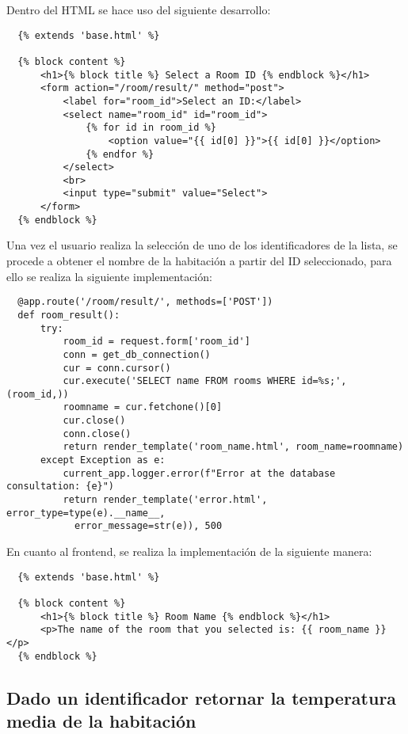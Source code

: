 \documentclass[11pt]{report}
\begin{document}
Dentro del HTML se hace uso del siguiente desarrollo:

\begin{verbatim}
  {% extends 'base.html' %}

  {% block content %}
      <h1>{% block title %} Select a Room ID {% endblock %}</h1>
      <form action="/room/result/" method="post">
          <label for="room_id">Select an ID:</label>
          <select name="room_id" id="room_id">
              {% for id in room_id %}
                  <option value="{{ id[0] }}">{{ id[0] }}</option>
              {% endfor %}
          </select>
          <br>
          <input type="submit" value="Select">
      </form>
  {% endblock %}
\end{verbatim}

Una vez el usuario realiza la selección de uno de los identificadores de la lista, se procede a obtener el nombre de la habitación a partir del ID seleccionado, para ello se realiza la siguiente implementación:

\begin{verbatim}
  @app.route('/room/result/', methods=['POST'])
  def room_result():
      try:
          room_id = request.form['room_id']
          conn = get_db_connection()
          cur = conn.cursor()
          cur.execute('SELECT name FROM rooms WHERE id=%s;', (room_id,))
          roomname = cur.fetchone()[0]
          cur.close()
          conn.close()
          return render_template('room_name.html', room_name=roomname)
      except Exception as e:
          current_app.logger.error(f"Error at the database consultation: {e}")
          return render_template('error.html', error_type=type(e).__name__, 
            error_message=str(e)), 500
\end{verbatim}

En cuanto al frontend, se realiza la implementación de la siguiente manera:

\begin{verbatim}
  {% extends 'base.html' %}

  {% block content %}
      <h1>{% block title %} Room Name {% endblock %}</h1>
      <p>The name of the room that you selected is: {{ room_name }}</p>
  {% endblock %}
\end{verbatim}

\subsection{Dado un identificador retornar la temperatura media de la habitación}
\end{document}
